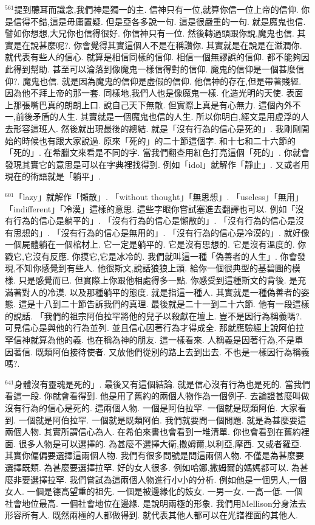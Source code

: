 \documentclass{book}
\begin{document}
$^{561}$提到聽耳而識念,我們神是獨一的主.
信神只有一位,就算你信一位上帝的信仰.
你是信得不錯,這是毋庸置疑.
但是亞各多說一句.
這是很嚴重的一句.
就是魔鬼也信.
譬如你想想,大兄你也信得很好.
你信神只有一位.
然後轉過頭跟你說,魔鬼也信.
其實是在說甚麼呢?.
你會覺得其實這個人不是在稱讚你.
其實就是在說是在滋潤你.
就代表有些人的信心.
就算是相信同樣的信仰.
相信一個無謬誤的信仰.
都不能夠因此得到幫助.
甚至可以淪落到像魔鬼一樣信得對的信仰.
魔鬼的信仰是一個甚麼信仰?.
魔鬼也信.
就是因為魔鬼的信仰是虛假的信仰.
他信神的存在,但是帶著賤經.
因為他不拜上帝的那一套.
同樣地,我們人也是像魔鬼一樣.
化造光明的天使.
表面上那張嘴巴真的朗朗上口.
說自己天下無敵.
但實際上真是有心無力.
這個內外不一,前後矛盾的人生.
其實就是一個魔鬼也信的人生.
所以你明白,經文是用虛浮的人去形容這班人.
然後就出現最後的總結.
就是「沒有行為的信心是死的」.
我剛剛開始的時候也有跟大家說過.
原來「死的」的二十節這個字.
和十七和二十六節的「死的」.
在希臘文來看是不同的字.
當我們翻查用紅色打亮這個「死的」.
你就會發現其實它的意思是可以在字典裡找得到.
例如「idol」就解作「靜止」.
又或者用現在的術語就是「躺平」.

$^{601}$「lazy」就解作「懶散」.
「without thought」「無思想」.
「useless」「無用」「indifferent」「冷漠」這樣的意思.
這些字眼你嘗試塞進去翻譯也可以.
例如「沒有行為的信心是躺平的」.
「沒有行為的信心是懶散的」.
「沒有行為的信心是沒有思想的」.
「沒有行為的信心是無用的」.
「沒有行為的信心是冷漠的」.
就好像一個屍體躺在一個棺材上.
它一定是躺平的.
它是沒有思想的.
它是沒有溫度的.
你戳它,它沒有反應.
你摸它,它是冰冷的.
我們就叫這一種「偽善者的人生」.
你會發現,不知你感覺到有些人.
他很斯文,說話狼狼上頭.
給你一個很典型的基碧圖的模樣.
只是感覺而已.
但實際上你跟他相處得多一點.
你感受到這種斯文的背後.
是充滿著對人的冷漠.
以及那種躺平的態度.
就是指這一種人.
其實就是一種偽善者的姿態.
這是十八到二十節告訴我們的真理.
最後就是二十一到二十六節.
他有一段這樣的說話.
「我們的祖宗阿伯拉罕將他的兒子以殺獻在壇上.
豈不是因行為稱義嗎?.
可見信心是與他的行為並列.
並且信心因著行為才得成全.
那就應驗經上說阿伯拉罕信神就算為他的義.
也在稱為神的朋友.
這一樣看來.
人稱義是因著行為,不是單因著信.
既類阿伯接待使者.
又放他們從別的路上去到出去.
不也是一樣因行為稱義嗎?.

$^{641}$身體沒有靈魂是死的」.
最後又有這個結論.
就是信心沒有行為也是死的.
當我們看這一段.
你就會看得到.
他是用了舊約的兩個人物作為一個例子.
去論證甚麼叫做沒有行為的信心是死的.
這兩個人物.
一個是阿伯拉罕.
一個就是既類阿伯.
大家看到.
一個就是阿伯拉罕.
一個就是既類阿伯.
我們就要問一個問題.
就是為甚麼要這兩個人物.
其實所謂信心為人.
在希伯來書也會看到一堆清單.
你也會看到在舊約裡面.
很多人物是可以選擇的.
為甚麼不選擇大衛,撒姆爾,以利亞,摩西.
又或者羅亞.
其實你偏偏要選擇這兩個人物.
我們有很多問號是問這兩個人物.
不僅是為甚麼要選擇既類.
為甚麼要選擇拉罕.
好的女人很多.
例如哈娜,撒姆爾的媽媽都可以.
為甚麼非要選擇拉罕.
我們嘗試為這兩個人物進行小小的分析.
例如他是一個男人,一個女人.
一個是德高望重的祖先.
一個是被邊緣化的妓女.
一男一女.
一高一低.
一個社會地位最高.
一個社會地位在邊緣.
是說明兩極的形象.
我們用Mellison分身法去形容所有人.
既然兩極的人都做得到.
就代表其他人都可以在光譜裡面的其他人.
\end{document}
